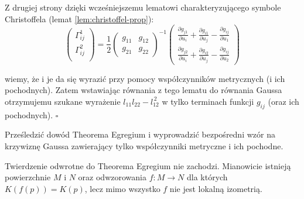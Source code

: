 \begin{frame}[<+->]

Z drugiej strony dzięki wcześniejszemu lematowi charakteryzującego symbole Christoffela (lemat \ref{lem:christoffel-prop}):
\[
\left(
\begin{array}{c}
\Gamma^1_{ij}\\
\Gamma^2_{ij}\\
\end{array}
\right)
=\frac{1}{2}\left(
\begin{array}{cc}
g_{11} & g_{12}\\
g_{21} & g_{22}
\end{array}
\right)^{-1}
\left(
\begin{array}{c}
\frac{\partial g_{j1}}{\partial u_i}+\frac{\partial g_{i1}}{\partial u_j}-\frac{\partial g_{ij}}{\partial u_1}\\
\frac{\partial g_{j2}}{\partial u_i}+\frac{\partial g_{i2}}{\partial u_j}-\frac{\partial g_{ij}}{\partial u_2}
\end{array}
\right)
\]

wiemy, że i je da się wyrazić przy pomocy współczynników metrycznych (i ich pochodnych). \pause Zatem wstawiając równania z tego lematu do równania Gaussa otrzymujemu szukane wyrażenie $l_{11}l_{22}-l_{12}^{\,2}$ w tylko terminach funkcji $g_{ij}$ (oraz ich pochodnych).
\hfill $\square$

\end{frame}
\begin{frame}[<+->]

\begin{exercise}
Prześledzić dowód Theorema Egregium i wyprowadzić bezpośredni wzór na krzywiznę Gaussa zawierający tylko współczynniki metryczne i ich pochodne.
\end{exercise}

\begin{uwaga}
Twierdzenie odwrotne do Theorema Egregium nie zachodzi. Mianowicie istnieją powierzchnie $M$ i $N$ oraz odwzorowania $f\colon M\to N$ dla których $K(f(p))=K(p)$, lecz mimo wszystko $f$ nie jest lokalną izometrią.
\end{uwaga}

\end{frame}

